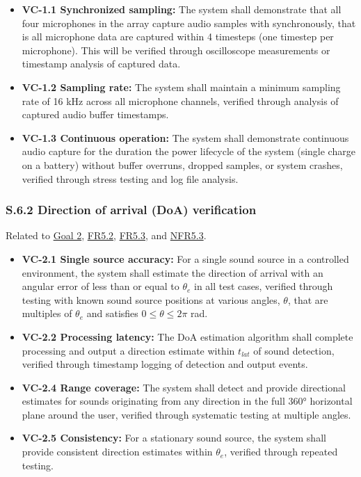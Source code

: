 \documentclass[12pt]{article}
\theoremstyle{definition}
\begin{document}
\begin{itemize}
\item \textbf{VC-1.1 Synchronized sampling:} The system shall demonstrate that
all four microphones in the array capture audio samples with synchronously, that
is all microphone data are captured within 4 timesteps (one timestep per
microphone). This will be verified through oscilloscope measurements or
timestamp analysis of captured data.

\item \textbf{VC-1.2 Sampling rate:} The system shall maintain a minimum
sampling rate of 16 kHz across all microphone channels, verified through
analysis of captured audio buffer timestamps.

\item \textbf{VC-1.3 Continuous operation:} The system shall demonstrate
continuous audio capture for the duration the power lifecycle of the system
(single charge on a battery) without buffer overruns, dropped samples, or
system crashes, verified through stress testing and log file analysis.
\end{itemize}

\subsubsection{S.6.2 Direction of arrival (DoA) verification}

Related to \hyperref[goal:audio_direction_analysis]{Goal 2},
\hyperref[FR5_2]{FR5.2}, \hyperref[FR5_3]{FR5.3}, and \hyperref[NFR5_3]{NFR5.3}.

\begin{itemize}
\item \textbf{VC-2.1 Single source accuracy:} For a single sound source in a
controlled environment, the system shall estimate the direction of arrival with
an angular error of less than or equal to \hyperref[symbol:theta_e]{$\theta_e$}
in all test cases, verified through testing with known sound source positions
at various angles, $\theta$, that are multiples of $\theta_e$ and satisfies
$0 \leq \theta \leq 2\pi$ rad.

\item \textbf{VC-2.2 Processing latency:} The DoA estimation algorithm shall
complete processing and output a direction estimate within
\hyperref[symbol:t_lat]{$t_{lat}$}  of
sound detection, verified through timestamp logging of detection and output
events.

\item \textbf{VC-2.4 Range coverage:} The system shall detect and provide
directional estimates for sounds originating from any direction in the full 360°
horizontal plane around the user, verified through systematic testing at
multiple angles.

\item \textbf{VC-2.5 Consistency:} For a stationary sound source, the system
shall provide consistent direction estimates within
\hyperref[symbol:theta_e]{$\theta_e$}, verified through repeated testing.
\end{itemize}
\end{document}
